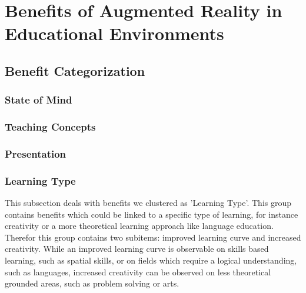 \section{Benefits of Augmented Reality in Educational Environments}
\subsection{Benefit Categorization}
\label{subsec:Benefits}

% 
\subsubsection{State of Mind}

% 
\subsubsection{Teaching Concepts}

% 
\subsubsection{Presentation}

% 
\subsubsection{Learning Type}
This subsection deals with benefits we clustered as 'Learning Type'. This group contains benefits which could be linked to a specific type of learning, for instance creativity or a more theoretical learning approach like language education. \\
Therefor this group contains two subitems: improved learning curve and increased creativity. While an improved learning curve is observable on skills based learning, such as spatial skills, or on fields which require a logical understanding, such as languages, increased creativity can be observed on less theoretical grounded areas, such as problem solving or arts.

